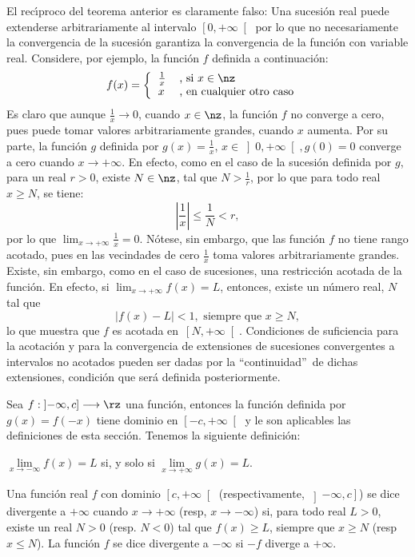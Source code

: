 El rec\'{\i}proco del teorema anterior es claramente falso: Una sucesi\'{o}n
real puede extenderse arbitrariamente al intervalo $\left[  0,+\infty\right[
$ por lo que no necesariamente la convergencia de la sucesi\'{o}n garantiza la
convergencia de la funci\'{o}n con variable real. Considere, por ejemplo, la
funci\'{o}n $f$ definida a continuaci\'{o}n:
\[
f(x)=\left\{
\begin{tabular}
[c]{ll}%
$\frac{1}{x}$ & , si $x\in\nz$\\
$x$ & , en cualquier otro caso
\end{tabular}
\ \ \right.
\]
Es claro que aunque $\frac{1}{x}\rightarrow0$, cuando $x\in\nz$, la
funci\'{o}n $f$ no converge a cero, pues puede tomar valores arbitrariamente
grandes, cuando $x$ aumenta. Por su parte, la funci\'{o}n $g$ definida por
$g(x)=\frac{1}{x}$, $x\in\left]  0,+\infty\right[  ,g(0)=0$ converge a cero
cuando $x\rightarrow+\infty$. En efecto, como en el caso de la sucesi\'{o}n
definida por $g$, para un real $r>0$, existe $N\in\nz$, tal que $N>\frac{1}%
{r}$, por lo que para todo real $x\geq N$, se tiene:
\[
\left\vert \frac{1}{x}\right\vert \leq\frac{1}{N}<r,
\]
por lo que $\lim_{x\rightarrow+\infty}\frac{1}{x}=0$. N\'{o}tese, sin embargo,
que las funci\'{o}n $f$ no tiene rango acotado, pues en las vecindades de cero
$\frac{1}{x}$ toma valores arbitrariamente grandes. Existe, sin embargo, como
en el caso de sucesiones, una restricci\'{o}n acotada de la funci\'{o}n. En
efecto, si $\lim_{x\rightarrow+\infty}f(x)=L$, entonces, existe un n\'{u}mero
real, $N$ tal que
\[
|f(x)-L|<1,\mbox{ \ siempre que \ }x\geq N,
\]
lo que muestra que $f$ es acotada en\ $\left[  N,+\infty\right[  $.
Condiciones de suficiencia para la acotaci\'{o}n y para la convergencia de
extensiones de sucesiones convergentes a intervalos no acotados pueden ser
dadas por la \textquotedblleft continuidad\textquotedblright\ de dichas
extensiones, condici\'{o}n que ser\'{a} definida posteriormente.

Sea $f:\left]  -\infty,c\right]  \longrightarrow\rz$ una funci\'{o}n, entonces
la funci\'{o}n definida por $g(x)=f(-x)$ tiene dominio en $\left[
-c,+\infty\right[  $ y le son aplicables las definiciones de esta secci\'{o}n.
Tenemos la siguiente definici\'{o}n:

\begin{definition}
$\lim\limits_{x\rightarrow-\infty}f(x)=L$ si, y solo si $\lim
\limits_{x\rightarrow+\infty}g(x)=L$.
\end{definition}

Una funci\'{o}n real $f$ con dominio $\left[  c,+\infty\right[  $
(respectivamente, $\left]  -\infty,c\right]  $) se dice divergente a $+\infty$
cuando $x\rightarrow+\infty$ (resp, $x\rightarrow-\infty$) si, para todo real
$L>0$, existe un real $N>0$ (resp. $N<0$) tal que $f(x)\geq L$, siempre que
$x\geq N$ (resp $x\leq N$). La funci\'{o}n $f$ se dice divergente a $-\infty$
si $-f$ diverge a $+\infty$.

